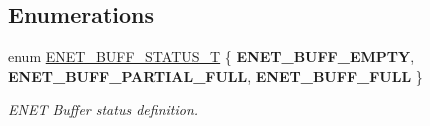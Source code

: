 \subsection*{Enumerations}
\begin{DoxyCompactItemize}
\item 
\hypertarget{group___e_n_e_t__17_x_x__40_x_x_gab29d71439401a8d4f68643acfd10959b}{enum \hyperlink{group___e_n_e_t__17_x_x__40_x_x_gab29d71439401a8d4f68643acfd10959b}{E\+N\+E\+T\+\_\+\+B\+U\+F\+F\+\_\+\+S\+T\+A\+T\+U\+S\+\_\+\+T} \{ {\bfseries E\+N\+E\+T\+\_\+\+B\+U\+F\+F\+\_\+\+E\+M\+P\+T\+Y}, 
{\bfseries E\+N\+E\+T\+\_\+\+B\+U\+F\+F\+\_\+\+P\+A\+R\+T\+I\+A\+L\+\_\+\+F\+U\+L\+L}, 
{\bfseries E\+N\+E\+T\+\_\+\+B\+U\+F\+F\+\_\+\+F\+U\+L\+L}
 \}}\label{group___e_n_e_t__17_x_x__40_x_x_gab29d71439401a8d4f68643acfd10959b}

\begin{DoxyCompactList}\small\item\em E\+N\+E\+T Buffer status definition. \end{DoxyCompactList}\end{DoxyCompactItemize}
